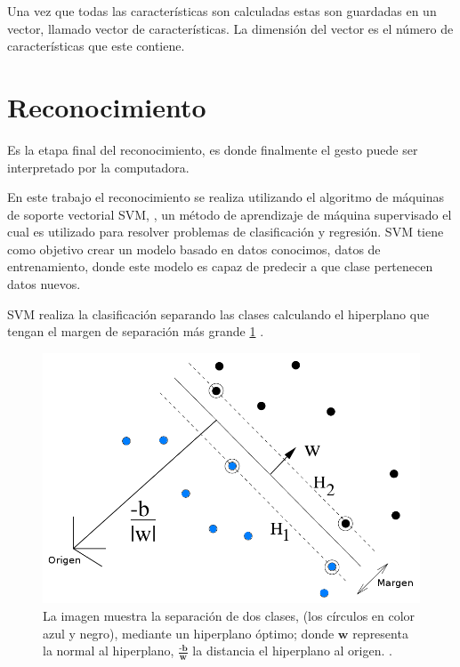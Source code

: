 Una vez que todas las características son calculadas estas son guardadas en un vector, llamado vector de características. La dimensión del vector es el número de características que este contiene. 




\section{Reconocimiento}\label{sec:SVM} 

Es la etapa final del reconocimiento, es donde finalmente el gesto puede ser interpretado por la computadora.  

En este trabajo el reconocimiento se realiza utilizando el algoritmo de máquinas de soporte vectorial SVM, \citep{Cortes1995}, un método de aprendizaje de máquina supervisado el cual es utilizado para resolver problemas de clasificación y regresión. SVM tiene como objetivo crear un modelo basado en datos conocimos, datos de entrenamiento, donde este modelo es capaz de predecir a que clase pertenecen datos nuevos. 

SVM realiza la clasificación separando las clases calculando el hiperplano que tengan el margen de separación más grande \ref{fig:SVM} .  

\begin{figure}[h!]
\begin{center}
\includegraphics[scale=.55]{./Figures/SVMarticle.png}
\end{center}
\caption{La imagen muestra la separación de dos clases, (los círculos en color azul y negro), mediante un hiperplano óptimo; donde $\textbf{w}$ representa la normal al hiperplano, $\frac{\textbf{-b}}{\textbf{w}}$ la distancia el hiperplano al origen. \citep{Burges1998}.}
\label{fig:SVM}
\end{figure} 

